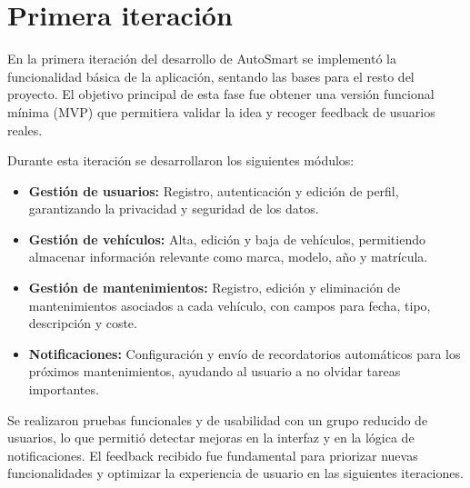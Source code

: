 \chapter{Primera iteración}

En la primera iteración del desarrollo de AutoSmart se implementó la funcionalidad básica de la aplicación, sentando las bases para el resto del proyecto. El objetivo principal de esta fase fue obtener una versión funcional mínima (MVP) que permitiera validar la idea y recoger feedback de usuarios reales.

Durante esta iteración se desarrollaron los siguientes módulos:
\begin{itemize}
    \item \textbf{Gestión de usuarios:} Registro, autenticación y edición de perfil, garantizando la privacidad y seguridad de los datos.
    \item \textbf{Gestión de vehículos:} Alta, edición y baja de vehículos, permitiendo almacenar información relevante como marca, modelo, año y matrícula.
    \item \textbf{Gestión de mantenimientos:} Registro, edición y eliminación de mantenimientos asociados a cada vehículo, con campos para fecha, tipo, descripción y coste.
    \item \textbf{Notificaciones:} Configuración y envío de recordatorios automáticos para los próximos mantenimientos, ayudando al usuario a no olvidar tareas importantes.
\end{itemize}

Se realizaron pruebas funcionales y de usabilidad con un grupo reducido de usuarios, lo que permitió detectar mejoras en la interfaz y en la lógica de notificaciones. El feedback recibido fue fundamental para priorizar nuevas funcionalidades y optimizar la experiencia de usuario en las siguientes iteraciones. 